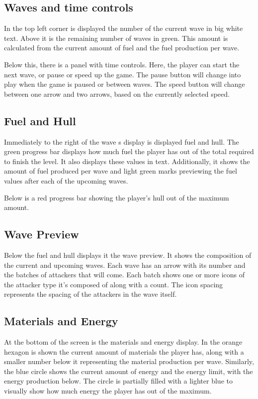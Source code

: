 \subsection{Waves and time controls}

In the top left corner is displayed the number of the current wave in big white text.
Above it is the remaining number of waves in green.
This amount is calculated from the current amount of fuel and the fuel production per wave.

Below this, there is a panel with time controls.
Here, the player can start the next wave, or pause or speed up the game.
The pause button will change into play when the game is paused or between waves.
The speed button will change between one arrow and two arrows, based on the currently selected speed.

\subsection{Fuel and Hull}

Immediately to the right of the wave s display is displayed fuel and hull.
The green progress bar displays how much fuel the player has out of the total required to finish the level.
It also displays these values in text.
Additionally, it shows the amount of fuel produced per wave and light green marks previewing the fuel values after each of the upcoming waves.

Below is a red progress bar showing the player's hull out of the maximum amount.

\subsection{Wave Preview}

Below the fuel and hull displays it the wave preview.
It shows the composition of the current and upcoming waves.
Each wave has an arrow with its number and the batches of attackers that will come.
Each batch shows one or more icons of the attacker type it's composed of along with a count.
The icon spacing represents the spacing of the attackers in the wave itself.

\subsection{Materials and Energy}

At the bottom of the screen is the materials and energy display.
In the orange hexagon is shown the current amount of materials the player has, along with a smaller number below it representing the material production per wave.
Similarly, the blue circle shows the current amount of energy and the energy limit, with the energy production below.
The circle is partially filled with a lighter blue to visually show how much energy the player has out of the maximum.

